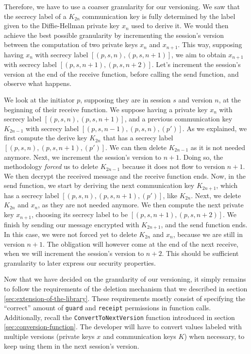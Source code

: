 Therefore, we have to use a coarser granularity for our versioning.
We saw that the secrecy label of a $K_{2n}$ communication key is fully determined by the label given to the Diffie-Hellman private key $x_{n}$ used to derive it.
We would then achieve the best possible granularity by incrementing the session's version between the computation of two private keys $x_{n}$ and $x_{n+1}$.
This way, supposing having $x_{n}$ with secrecy label $[(p,s,n),(p,s,n+1)]$, we aim to obtain $x_{n+1}$ with secrecy label $[(p,s,n+1),(p,s,n+2)]$.
Let's increment the session's version at the end of the receive function, before calling the send function, and observe what happens.

We look at the initiator $p$, supposing they are in session $s$ and version $n$, at the beginning of their receive function. We suppose having a private key $x_{n}$ with secrecy label $[(p,s,n),(p,s,n+1)]$, and a previous communication key $K_{2n-1}$ with secrecy label $[(p,s,n-1),(p,s,n),(p')]$.
As we explained, we first compute the derive key $K_{2n}$ that has a secrecy label $[(p,s,n),(p,s,n+1),(p')]$.
We can then delete $K_{2n-1}$ as it is not needed anymore.
Next, we increment the session's version to $n+1$.
Doing so, the methodology \emph{forced} us to delete $K_{2n-1}$ because it does not flow to version $n+1$.
We then decrypt the received message and the receive function ends.
Now, in the send function, we start by deriving the next communication key $K_{2n+1}$, which has a secrecy label $[(p,s,n),(p,s,n+1),(p')]$, like $K_{2n}$.
Next, we delete $K_{2n}$ and $x_{n}$, as they are not needed anymore.
We then compute the next private key $x_{n+1}$, choosing its secrecy label to be $[(p,s,n+1),(p,s,n+2)]$.
We finish by sending our message encrypted with $K_{2n+1}$, and the send function ends.
In this case, we were not forced yet to delete $K_{2n}$ and $x_{n}$, because we are still in version $n+1$. The obligation will however come at the end of the next receive, when we will increment the session's version to $n+2$.
This should be sufficient granularity to later express our security properties.

Now that we have decided on the granularity of our versioning, it simply remains to follow the requirements of the deletion mechanism that we described in section \ref{sec:extension-of-the-library}.
These requirements mostly consist of specifying the “correct” amount of \texttt{guard} and \texttt{receipt} permissions in function calls. 
Additionally, recall the \texttt{ConvertToNextVersion} function introduced in section \ref{sec:conversion-function}.
The developer will have to convert values labeled with multiple versions (private keys $x$ and communication keys $K$) when necessary, to keep using them in the next session's version.


